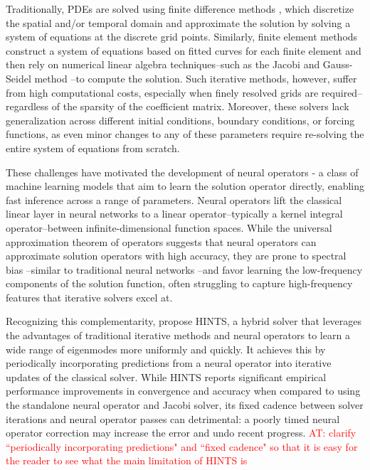 \documentclass{article} %
\newcommand\ambuj[1]{\textcolor{red}{AT: #1}}
\begin{document}
Traditionally, PDEs are solved using finite difference methods \citep{smith1985numerical,leveque2007finite}, which discretize the spatial and/or temporal domain and approximate the solution by solving a system of equations at the discrete grid points. Similarly, finite element methods \citep{hughes2003finite,bathe2006finite,brenner2008mathematical} construct a system of equations based on fitted curves for each finite element and then rely on numerical linear algebra techniques--such as the Jacobi and Gauss-Seidel method \citep{saad2003iterative}--to compute the solution. Such iterative methods, however, suffer from high computational costs, especially when finely resolved grids are required--regardless of the sparsity of the coefficient matrix. Moreover, these solvers lack generalization across different initial conditions, boundary conditions, or forcing functions, as even minor changes to any of these parameters require re-solving the entire system of equations from scratch. 

These challenges have motivated the development of neural operators \citep{kovachki2023neural} - a class of machine learning models that aim to learn the solution operator directly, enabling fast inference across a range of parameters. Neural operators lift the classical linear layer in neural networks to a linear operator--typically a kernel integral operator--between infinite-dimensional function spaces. While the universal approximation theorem of operators \citep{chen1995universal} suggests that neural operators can approximate solution operators with high accuracy, they are prone to spectral bias \citep{liu2021multiscale,liu2024mitigating,you2024mscalefno,khodakarami2025mitigating,xu2025understanding}--similar to traditional neural networks \citep{rahaman2019spectral,xu2019frequency,luo2019theory}--and favor learning the low-frequency components of the solution function, often struggling to capture high-frequency features that iterative solvers excel at. 

Recognizing this complementarity, \citet{zhang2024blending} propose HINTS, a hybrid solver that leverages the advantages of traditional iterative methods and neural operators  to learn a wide range of eigenmodes more uniformly and quickly. It achieves this by periodically incorporating predictions from a neural operator into iterative updates of the classical solver. While HINTS reports significant empirical performance improvements in convergence and accuracy when compared to using the standalone neural operator and Jacobi solver, its fixed cadence between solver iterations and neural operator passes can 
detrimental: a poorly timed neural operator correction may increase the error and undo recent progress. \ambuj{clarify ``periodically incorporating predictions" and ``fixed cadence" so that it is easy for the reader to see what the main limitation of HINTS is}
\end{document}
